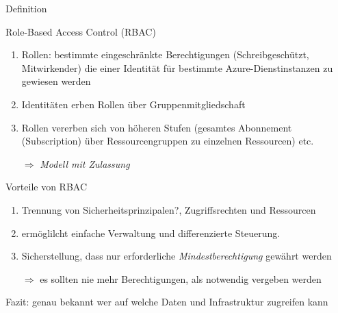 \documentclass{scrartcl}
\newenvironment{flashcard}[2][]{%
    #1
    \vfill
    \centerline{\Large{#2}}
    \vfill
\newpage
}
{\newpage}
\begin{document}
    \begin{flashcard}[Definition]{Role-Based Access Control (RBAC)}
        \begin{enumerate}
            \item Rollen: bestimmte eingeschränkte Berechtigungen (Schreibgeschützt, Mitwirkender) die einer Identität für bestimmte Azure-Dienstinstanzen zu gewiesen werden
            \item Identitäten erben Rollen über Gruppenmitgliedschaft
            \item Rollen vererben sich von höheren Stufen (gesamtes Abonnement (Subscription) über Ressourcengruppen zu einzelnen Ressourcen) etc.
            \item[$\Rightarrow$] \emph{Modell mit Zulassung}
        \end{enumerate}
    \end{flashcard}

    \begin{flashcard}[]{Vorteile von RBAC}
        \begin{enumerate}
            \item Trennung von Sicherheitsprinzipalen?, Zugriffsrechten und Ressourcen
            \item ermöglilcht einfache Verwaltung und differenzierte Steuerung.
            \item Sicherstellung, dass nur erforderliche \emph{Mindestberechtigung} gewährt werden
            \item[$\Rightarrow$] es sollten nie mehr Berechtigungen, als notwendig vergeben werden
        \end{enumerate}
        Fazit: genau bekannt wer auf welche Daten und Infrastruktur zugreifen kann
    \end{flashcard}
\end{document}
